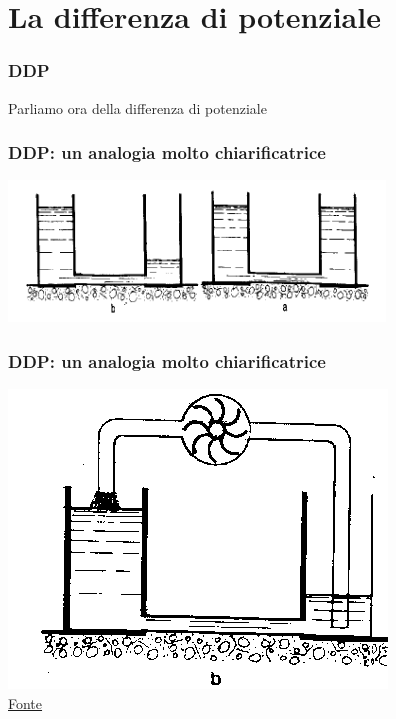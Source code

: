 	\section{La differenza di potenziale} %
	\label{sec:la_differenza_di_potenziale}
		
		\begin{frame}[c]\frametitle{DDP}
		    
			Parliamo ora della differenza di potenziale
		
		\end{frame}

		\begin{frame}[c]\frametitle{DDP: un analogia molto chiarificatrice}
		    
			\includegraphics[width=10cm]{./img/ddp1.png}
		
		\end{frame}

		\begin{frame}[c]\frametitle{DDP: un analogia molto chiarificatrice}
		    
			\includegraphics[width=8CM]{./img/ddp2.png}\\

			\href{http://web.mclink.it/MK1411/Apprendistato/ImpiantiElettrici/Lezioni\%20di\%20Elettrotecnica/Lezione\%201_30_Web.htm}{Fonte}
		
		\end{frame}

